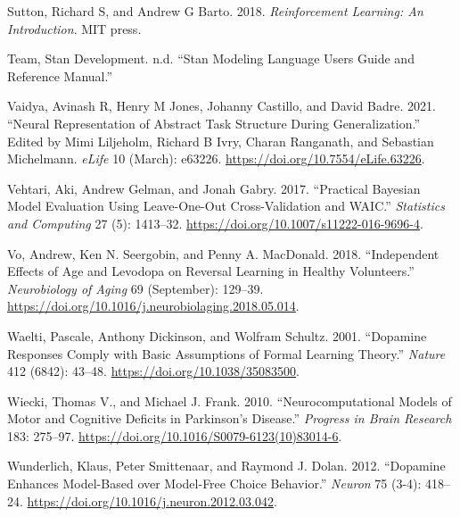 \documentclass{article}
\newlength{\cslhangindent}
\newlength{\cslentryspacingunit} %
\newenvironment{CSLReferences}[2] %
 {%
  \setlength{\parindent}{0pt}
  \ifodd #1
  \let\oldpar\par
  \def\par{\hangindent=\cslhangindent\oldpar}
  \fi
  \setlength{\parskip}{#2\cslentryspacingunit}
 }%
 {}
\begin{document}
\begin{CSLReferences}{1}{0}
\leavevmode{}%
Sutton, Richard S, and Andrew G Barto. 2018. \emph{Reinforcement
Learning: {An} Introduction}. {MIT press}.

\leavevmode{}%
Team, Stan Development. n.d. {``Stan {Modeling Language Users Guide} and
{Reference Manual}.''}

\leavevmode{}%
Vaidya, Avinash R, Henry M Jones, Johanny Castillo, and David Badre.
2021. {``Neural Representation of Abstract Task Structure During
Generalization.''} Edited by Mimi Liljeholm, Richard B Ivry, Charan
Ranganath, and Sebastian Michelmann. \emph{eLife} 10 (March): e63226.
\url{https://doi.org/10.7554/eLife.63226}.

\leavevmode{}%
Vehtari, Aki, Andrew Gelman, and Jonah Gabry. 2017. {``Practical
{Bayesian} Model Evaluation Using Leave-One-Out Cross-Validation and
{WAIC}.''} \emph{Statistics and Computing} 27 (5): 1413--32.
\url{https://doi.org/10.1007/s11222-016-9696-4}.

\leavevmode{}%
Vo, Andrew, Ken N. Seergobin, and Penny A. MacDonald. 2018.
{``Independent Effects of Age and Levodopa on Reversal Learning in
Healthy Volunteers.''} \emph{Neurobiology of Aging} 69 (September):
129--39. \url{https://doi.org/10.1016/j.neurobiolaging.2018.05.014}.

\leavevmode{}%
Waelti, Pascale, Anthony Dickinson, and Wolfram Schultz. 2001.
{``Dopamine Responses Comply with Basic Assumptions of Formal Learning
Theory.''} \emph{Nature} 412 (6842): 43--48.
\url{https://doi.org/10.1038/35083500}.

\leavevmode{}%
Wiecki, Thomas V., and Michael J. Frank. 2010. {``Neurocomputational
Models of Motor and Cognitive Deficits in {Parkinson}'s Disease.''}
\emph{Progress in Brain Research} 183: 275--97.
\url{https://doi.org/10.1016/S0079-6123(10)83014-6}.

\leavevmode{}%
Wunderlich, Klaus, Peter Smittenaar, and Raymond J. Dolan. 2012.
{``Dopamine {Enhances Model-Based} over {Model-Free Choice Behavior}.''}
\emph{Neuron} 75 (3-4): 418--24.
\url{https://doi.org/10.1016/j.neuron.2012.03.042}.

\end{CSLReferences}



\end{document}
